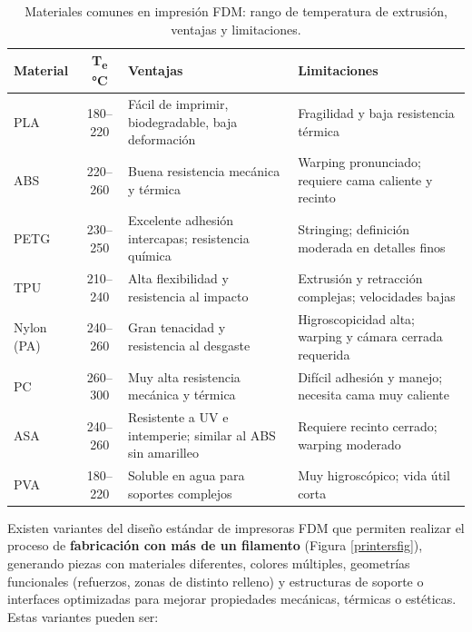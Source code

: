 \begin{table}[h]
  \centering
  \small
  \begin{tabular}{|l|c|p{5cm}|p{5cm}|}
    \hline
    \textbf{Material}    & \textbf{T\textsubscript{e} °C} & \textbf{Ventajas}                          & \textbf{Limitaciones}                             \\
    \hline
    PLA                  & 180–220                           & Fácil de imprimir, biodegradable, baja deformación              & Fragilidad y baja resistencia térmica               \\
    \hline
    ABS                  & 220–260                          & Buena resistencia mecánica y térmica                           & Warping pronunciado; requiere cama caliente y recinto     \\
    \hline
    PETG                 & 230–250                          & Excelente adhesión intercapas; resistencia química             & Stringing; definición moderada en detalles finos       \\
    \hline
    TPU                  & 210–240                         & Alta flexibilidad y resistencia al impacto                     & Extrusión y retracción complejas; velocidades bajas        \\
    \hline
    Nylon (PA)           & 240–260                        & Gran tenacidad y resistencia al desgaste                       & Higroscopicidad alta; warping y cámara cerrada requerida   \\
    \hline
    PC                   & 260–300                          & Muy alta resistencia mecánica y térmica                        & Difícil adhesión y manejo; necesita cama muy caliente      \\
    \hline
    ASA                  & 240–260                           & Resistente a UV e intemperie; similar al ABS sin amarilleo     & Requiere recinto cerrado; warping moderado                 \\
    \hline
    PVA        & 180–220                           & Soluble en agua para soportes complejos                       & Muy higroscópico; vida útil corta                          \\
    \hline
  \end{tabular}
  \caption{Materiales comunes en impresión FDM: rango de temperatura de extrusión, ventajas y limitaciones.}
  \label{tab:materiales_fdm}
\end{table}

Existen variantes del diseño estándar de impresoras FDM que permiten realizar el proceso de \textbf{fabricación con más de un filamento} (Figura \ref{printersfig}), generando piezas con materiales diferentes, colores múltiples, geometrías funcionales (refuerzos, zonas de distinto relleno) y estructuras de soporte o interfaces optimizadas para mejorar propiedades mecánicas, térmicas o estéticas. Estas variantes pueden ser:


